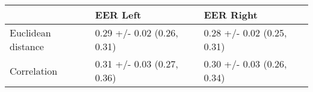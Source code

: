 \begin{tabular}{lll}
\toprule
{} &                    EER Left &                   EER Right \\
\midrule
Euclidean distance &  0.29 +/- 0.02 (0.26, 0.31) &  0.28 +/- 0.02 (0.25, 0.31) \\
Correlation        &  0.31 +/- 0.03 (0.27, 0.36) &  0.30 +/- 0.03 (0.26, 0.34) \\
\bottomrule
\end{tabular}
